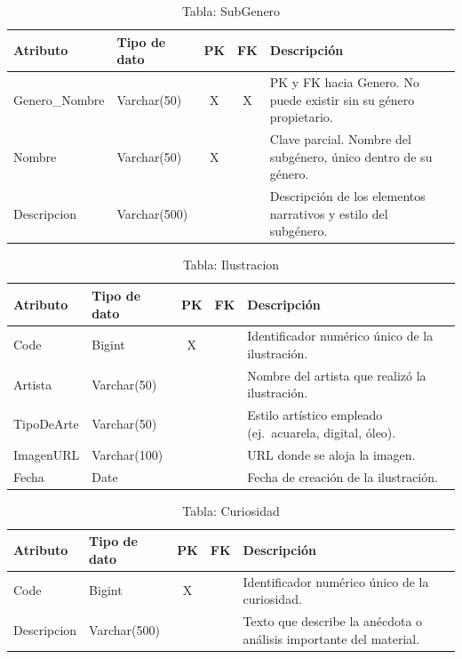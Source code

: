 \documentclass[12pt,a4paper]{article}
\begin{document}
\begin{table}[H]
\centering
\begin{tabularx}{\textwidth}{|l|l|c|c|X|}
\hline
\textbf{Atributo} & \textbf{Tipo de dato} & \textbf{PK} & \textbf{FK} & \textbf{Descripción} \\ \hline
Genero\_Nombre & Varchar(50)  & X & X & PK y FK hacia Genero. No puede existir sin su género propietario. \\ \hline
Nombre         & Varchar(50)  & X & & Clave parcial. Nombre del subgénero, único dentro de su género. \\ \hline
Descripcion    & Varchar(500) & & & Descripción de los elementos narrativos y estilo del subgénero. \\ \hline
\end{tabularx}
\caption{Tabla: SubGenero}
\end{table}

\begin{table}[H]
\centering
\begin{tabularx}{\textwidth}{|l|l|c|c|X|}
\hline
\textbf{Atributo} & \textbf{Tipo de dato} & \textbf{PK} & \textbf{FK} & \textbf{Descripción} \\ \hline
Code       & Bigint       & X & & Identificador numérico único de la ilustración. \\ \hline
Artista    & Varchar(50)  & & & Nombre del artista que realizó la ilustración. \\ \hline
TipoDeArte & Varchar(50)  & & & Estilo artístico empleado (ej.\ acuarela, digital, óleo). \\ \hline
ImagenURL  & Varchar(100) & & & URL donde se aloja la imagen. \\ \hline
Fecha      & Date         & & & Fecha de creación de la ilustración. \\ \hline
\end{tabularx}
\caption{Tabla: Ilustracion}
\end{table}

\begin{table}[H]
\centering
\begin{tabularx}{\textwidth}{|l|l|c|c|X|}
\hline
\textbf{Atributo} & \textbf{Tipo de dato} & \textbf{PK} & \textbf{FK} & \textbf{Descripción} \\ \hline
Code        & Bigint       & X & & Identificador numérico único de la curiosidad. \\ \hline
Descripcion & Varchar(500) & & & Texto que describe la anécdota o análisis importante del material. \\ \hline
\end{tabularx}
\caption{Tabla: Curiosidad}
\end{table}
\end{document}
